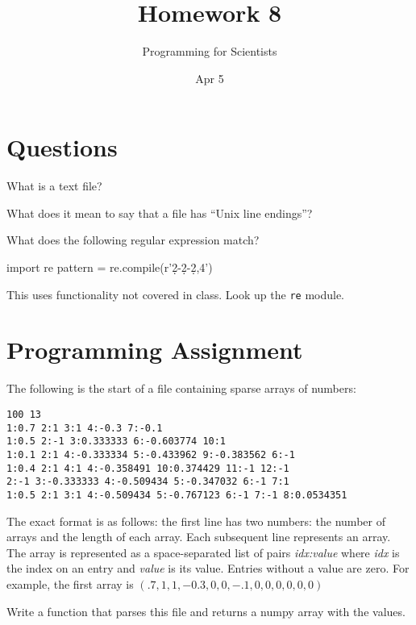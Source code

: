 
\author{Programming for Scientists}
\title{Homework 8}
\date{Apr 5}

\maketitle

\chapter{Questions}

\question
What is a text file?

\question
What does it mean to say that a file has ``Unix line endings''?

\question
What does the following regular expression match?

\begin{python}
import re
pattern = re.compile(r'\d{2}-\d{2}-\d{2,4}')
\end{python}

This uses functionality not covered in class. Look up the \texttt{re} module.

\chapter{Programming Assignment}

The following is the start of a file containing sparse arrays of numbers:

\begin{verbatim}
100 13
1:0.7 2:1 3:1 4:-0.3 7:-0.1
1:0.5 2:-1 3:0.333333 6:-0.603774 10:1
1:0.1 2:1 4:-0.333334 5:-0.433962 9:-0.383562 6:-1
1:0.4 2:1 4:1 4:-0.358491 10:0.374429 11:-1 12:-1
2:-1 3:-0.333333 4:-0.509434 5:-0.347032 6:-1 7:1
1:0.5 2:1 3:1 4:-0.509434 5:-0.767123 6:-1 7:-1 8:0.0534351
\end{verbatim}

The exact format is as follows: the first line has two numbers: the number of arrays and the length of each array. Each subsequent line represents an array. The array is represented as a space-separated list of pairs \textit{idx:value} where \textit{idx} is the index on an entry and \textit{value} is its value. Entries without a value are zero. For example, the first array is $(.7,1,1,-0.3,0,0,-.1,0,0,0,0,0,0)$

Write a function that parses this file and returns a numpy array with the values.



